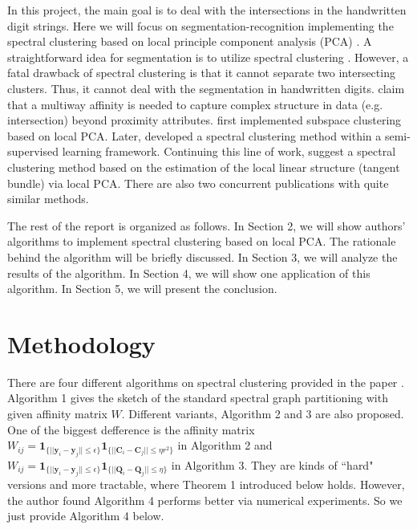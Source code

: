 In this project, the main goal is to deal with the intersections in the handwritten digit strings.
Here we will focus on segmentation-recognition implementing the spectral clustering based on local principle component analysis (PCA) \citep{arias2017}.
A straightforward idea for segmentation is to utilize spectral clustering \citep{ng2002}.
However, a fatal drawback of spectral clustering is that it cannot separate two intersecting clusters.
Thus, it cannot deal with the segmentation in handwritten digits.
\citet{shashua2006} claim that a multiway affinity is needed to capture complex structure in data (e.g. intersection) beyond proximity attributes.
\citet{fan2006} first implemented subspace clustering based on local PCA.
Later, \citet{goldberg2009} developed a spectral clustering method within a semi-supervised learning framework.
Continuing this line of work, \citep{arias2011} suggest a spectral clustering method based on the estimation of the local linear structure (tangent bundle) via local PCA.
There are also two concurrent publications \citep{wang2011, gong2012} with quite similar methods.

The rest of the report is organized as follows.
In Section 2, we will show authors' algorithms to implement spectral clustering based on local PCA.
The rationale behind the algorithm will be briefly discussed.
In Section 3, we will analyze the results of the algorithm.
In Section 4, we will show one application of this algorithm.
In Section 5, we will present the conclusion.

\section{Methodology}

There are four different algorithms on spectral clustering provided in the paper \citep{arias2017}.
Algorithm 1 gives the sketch of the standard spectral graph partitioning with given affinity matrix \(W\).
Different variants, Algorithm 2 and 3 are also proposed.
One of the biggest defference is the affinity matrix 
$W_{ij} = \boldsymbol{1}_{ \{ || \boldsymbol{y}_i - \boldsymbol{y}_j || \leq \epsilon \} } 
 \boldsymbol{1}_{ \{ || \boldsymbol{C}_i - \boldsymbol{C}_j || \leq \eta r^2 \}}  $ in Algorithm 2 and 
$W_{ij} = \boldsymbol{1}_{ \{ || \boldsymbol{y}_i - \boldsymbol{y}_j || \leq \epsilon \} } 
 \boldsymbol{1}_{ \{ || \boldsymbol{Q}_i - \boldsymbol{Q}_j || \leq \eta \}}  $ in Algorithm 3. 
They are kinds of ``hard" versions and more tractable, where Theorem 1 introduced below holds.
However, the author found  Algorithm 4 performs better via numerical experiments.
So we just provide Algorithm 4 below.


